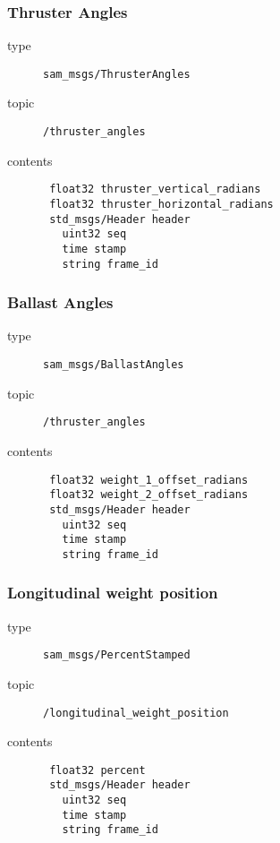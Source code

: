 \documentclass[9pt,technote]{IEEEtran} %
\begin{document}
\subsubsection{Thruster Angles}

\begin{description}
\item[type] \texttt{sam\_msgs/ThrusterAngles}
\item[topic] \texttt{/thruster\_angles}
\item[contents] \begin{scriptsize}
\begin{verbatim}
 float32 thruster_vertical_radians
 float32 thruster_horizontal_radians
 std_msgs/Header header
   uint32 seq
   time stamp
   string frame_id
\end{verbatim}
\end{scriptsize}
\end{description}

\subsubsection{Ballast Angles}

\begin{description}
\item[type] \texttt{sam\_msgs/BallastAngles}
\item[topic] \texttt{/thruster\_angles}
\item[contents] \begin{scriptsize}
\begin{verbatim}
 float32 weight_1_offset_radians
 float32 weight_2_offset_radians
 std_msgs/Header header
   uint32 seq
   time stamp
   string frame_id
\end{verbatim}
\end{scriptsize}
\end{description}

\subsubsection{Longitudinal weight position} 

\begin{description}
\item[type] \texttt{sam\_msgs/PercentStamped}
\item[topic] \texttt{/longitudinal\_weight\_position}
\item[contents] \begin{scriptsize}
\begin{verbatim}
 float32 percent
 std_msgs/Header header
   uint32 seq
   time stamp
   string frame_id
\end{verbatim}
\end{scriptsize}
\end{description}
\end{document}
